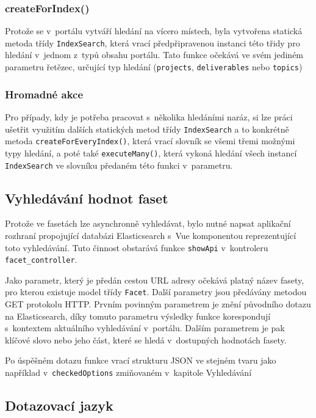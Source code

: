 \subsubsection*{createForIndex()}
Protože se v~portálu vytváří hledání na vícero místech, byla vytvořena statická metoda třídy \texttt{IndexSearch}, která vrací předpřipravenou instanci této třidy pro hledání v~jednom z~typů obsahu portálu. Tato funkce očekává ve svém jediném parametru řetězec, určující typ hledání (\texttt{projects}, \texttt{deliverables} nebo \texttt{topics})

\subsubsection*{Hromadné akce}
Pro případy, kdy je potřeba pracovat s~několika hledáními naráz, si lze práci ušetřit využitím dalších statických metod třídy \texttt{IndexSearch} a to konkrétně metoda \texttt{createForEveryIndex()}, která vrací slovník se všemi třemi možnými typy hledání, a poté také \texttt{executeMany()}, která vykoná hledání všech instancí \texttt{IndexSearch} ve slovníku předaném této funkci v~parametru. 

\subsection{Vyhledávání hodnot faset}
Protože ve fasetách lze asynchronně vyhledávat, bylo nutné napsat aplikační rozhraní propojující databázi Elasticsearch s~Vue komponentou reprezentující toto vyhledávání. Tuto činnost obstarává funkce \texttt{showApi} v~kontroleru \texttt{facet\_controller}.

Jako parametr, který je předán cestou URL adresy očekává platný název fasety, pro kterou existuje model třídy \texttt{Facet}. Další parametry jsou předávány metodou GET protokolu HTTP. Prvním povinným parametrem je znění původního dotazu na Elasticsearch, díky tomuto parametru výsledky funkce korespondují s~kontextem aktuálního vyhledávání v~portálu. Dalším parametrem je pak klíčové slovo nebo jeho část, které se hledá v~dostupných hodnotách fasety. 

Po úspěšném dotazu funkce vrací strukturu JSON ve stejném tvaru jako například v~\texttt{checkedOptions} zmiňovaném v~kapitole Vyhledávání %

\subsection{Dotazovací jazyk}
\blindtext[2]


